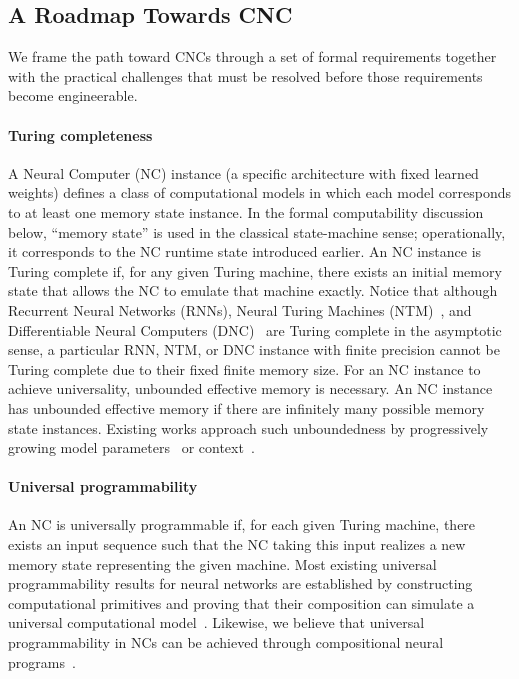 \subsection{A Roadmap Towards CNC}
\label{sec:roadmap}

We frame the path toward CNCs through a set of formal requirements together with the practical challenges that must be resolved before those requirements become engineerable.

\paragraph{Turing completeness}
A Neural Computer (NC) instance (a specific architecture with fixed learned weights) defines a class of computational models in which each model corresponds to at least one memory state instance.
In the formal computability discussion below, ``memory state'' is used in the classical state-machine sense; operationally, it corresponds to the NC runtime state introduced earlier.
An NC instance is Turing complete if, for any given Turing machine, there exists an initial memory state that allows the NC to emulate that machine exactly.
Notice that although Recurrent Neural Networks (RNNs), Neural Turing Machines (NTM)~\citep{graves2014neural}, and Differentiable Neural Computers (DNC)~\citep{graves2016hybrid} are Turing complete in the asymptotic sense, a particular RNN, NTM, or DNC instance with finite precision cannot be Turing complete due to their fixed finite memory size.
For an NC instance to achieve universality, unbounded effective memory is necessary. 
An NC instance has unbounded effective memory if there are infinitely many possible memory state instances. 
Existing works approach such unboundedness by progressively growing model parameters~\citep{fritzke1994growing,rusu2016progressive} or context~\citep{vaswani2017attention}.

\paragraph{Universal programmability}
An NC is universally programmable if, for each given Turing machine, there exists an input sequence such that the NC taking this input realizes a new memory state representing the given machine.
Most existing universal programmability results for neural networks are established by constructing computational primitives and proving that their composition can simulate a universal computational model~\citep{reed2015neural}.
Likewise, we believe that universal programmability in NCs can be achieved through compositional neural programs~\citep{pierrot2019learning}.

